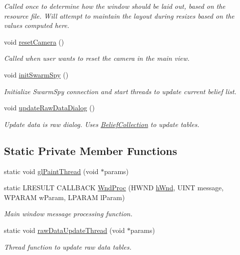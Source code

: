 \begin{DoxyCompactItemize}
\begin{DoxyCompactList}\small\item\em Called once to determine how the window should be laid out, based on the resource file. Will attempt to maintain the layout during resizes based on the values computed here. \end{DoxyCompactList}\item 
\hypertarget{class_three_d_viewer_aba5ca684b6ae3d51c95d405a995e7770}{
void \hyperlink{class_three_d_viewer_aba5ca684b6ae3d51c95d405a995e7770}{resetCamera} ()}
\label{class_three_d_viewer_aba5ca684b6ae3d51c95d405a995e7770}

\begin{DoxyCompactList}\small\item\em Called when user wants to reset the camera in the main view. \end{DoxyCompactList}\item 
void \hyperlink{class_three_d_viewer_ab6fdde8d62acb6847ca4f05371d91e76}{initSwarmSpy} ()
\begin{DoxyCompactList}\small\item\em Initialize SwarmSpy connection and start threads to update current belief list. \end{DoxyCompactList}\item 
void \hyperlink{class_three_d_viewer_a7062224b24a3e6834c7746964024d7b9}{updateRawDataDialog} ()
\begin{DoxyCompactList}\small\item\em Update data is raw dialog. Uses \hyperlink{class_belief_collection}{BeliefCollection} to update tables. \end{DoxyCompactList}\end{DoxyCompactItemize}
\subsection*{Static Private Member Functions}
\begin{DoxyCompactItemize}
\item 
static void \hyperlink{class_three_d_viewer_a021428227730324b5c2f9f179b9d6628}{glPaintThread} (void $\ast$params)
\item 
static LRESULT CALLBACK \hyperlink{class_three_d_viewer_afcb35237ccab9e6e4dffc176e1202803}{WndProc} (HWND \hyperlink{class_three_d_viewer_ae7122f9f106f58afc902c77c89cf97c4}{hWnd}, UINT message, WPARAM wParam, LPARAM lParam)
\begin{DoxyCompactList}\small\item\em Main window message processing function. \end{DoxyCompactList}\item 
\hypertarget{class_three_d_viewer_aeac441d178003a7f6ecef723551a93f3}{
static void \hyperlink{class_three_d_viewer_aeac441d178003a7f6ecef723551a93f3}{rawDataUpdateThread} (void $\ast$params)}
\label{class_three_d_viewer_aeac441d178003a7f6ecef723551a93f3}

\begin{DoxyCompactList}\small\item\em Thread function to update raw data tables. \end{DoxyCompactList}\end{DoxyCompactItemize}
